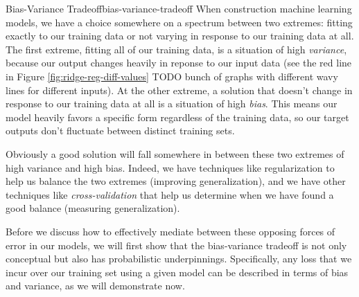 \begin{definition}{Bias-Variance Tradeoff}{bias-variance-tradeoff}
    When construction machine learning models, we have a choice somewhere on a spectrum between two extremes: fitting exactly to our training data or not varying in response to our training data at all. The first extreme, fitting all of our training data, is a situation of high \textit{variance}, because our output changes heavily in reponse to our input data (see the red line in Figure \ref{fig:ridge-reg-diff-values} TODO bunch of graphs with different wavy lines for different inputs). At the other extreme, a solution that doesn't change in response to our training data at all is a situation of high \textit{bias}. This means our model heavily favors a specific form regardless of the training data, so our target outputs don't fluctuate between distinct training sets.
\end{definition}

Obviously a good solution will fall somewhere in between these two extremes of high variance and high bias. Indeed, we have techniques like regularization to help us balance the two extremes (improving generalization), and we have other techniques like \textit{cross-validation} that help us determine when we have found a good balance (measuring generalization).


Before we discuss how to effectively mediate between these opposing forces of error in our models, we will first show that the bias-variance tradeoff is not only conceptual but also has probabilistic underpinnings. Specifically, any loss that we incur over our training set using a given model can be described in terms of bias and variance, as we will demonstrate now.

